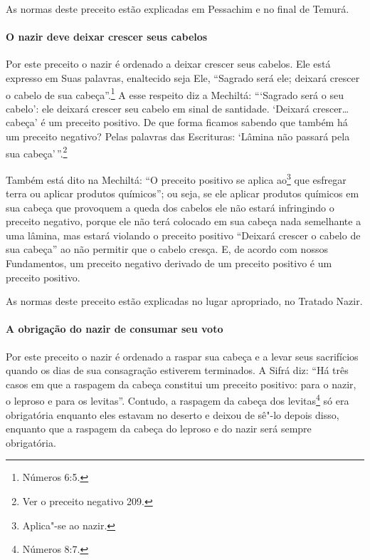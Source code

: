\begin{multicols}{2}
As normas deste preceito estão explicadas em Pessachim\starr{} e no final de Temurá\starr.

\paragraph{O nazir\starr{} deve deixar crescer seus cabelos}

Por este preceito o nazir\starr{} é ordenado a deixar crescer seus cabelos. Ele
está expresso em Suas palavras, enaltecido seja Ele, ``Sagrado será ele;
deixará crescer o cabelo de sua cabeça''.\footnote{Números 6:5.} A esse respeito
diz a Mechiltá\starr: ```Sagrado será o seu cabelo': ele deixará crescer seu
cabelo em sinal de santidade. `Deixará crescer\ldots{} cabeça' é um preceito
positivo. De que forma ficamos sabendo que também há um preceito
negativo? Pelas palavras das Escrituras: `Lâmina não passará pela sua
cabeça'\,''.\footnote{Ver o preceito negativo 209.}

Também está dito na Mechiltá\starr: ``O preceito positivo se aplica
ao\footnote{Aplica"-se ao nazir\starr.} que esfregar terra ou aplicar produtos
químicos''; ou seja, se ele aplicar produtos químicos em sua cabeça que provoquem a queda dos cabelos ele não
estará infringindo o preceito negativo, porque ele não terá colocado em
sua cabeça nada semelhante a uma lâmina, mas estará violando o preceito
positivo ``Deixará crescer o cabelo de sua cabeça'' ao não permitir que
o cabelo cresça. E, de acordo com nossos Fundamentos, um preceito
negativo derivado de um preceito positivo é um preceito positivo.

As normas deste preceito estão explicadas no lugar apropriado, no Tratado Nazir\starr.

\paragraph{A obrigação do nazir\starr{} de consumar seu voto}

Por este preceito o nazir\starr{} é ordenado a raspar sua cabeça e a levar seus
sacrifícios quando os dias de sua consagração estiverem terminados. A
Sifrá\starr{} diz: ``Há três casos em que a raspagem da cabeça constitui um
preceito positivo: para o nazir\starr, o leproso e para os levitas\starr''.
Contudo, a raspagem da cabeça dos levitas\starr\footnote{Números 8:7.} só era
obrigatória enquanto eles estavam no deserto e deixou de sê"-lo depois disso, enquanto que a raspagem da cabeça do leproso e do nazir\starr{} será sempre obrigatória.


\end{multicols}
